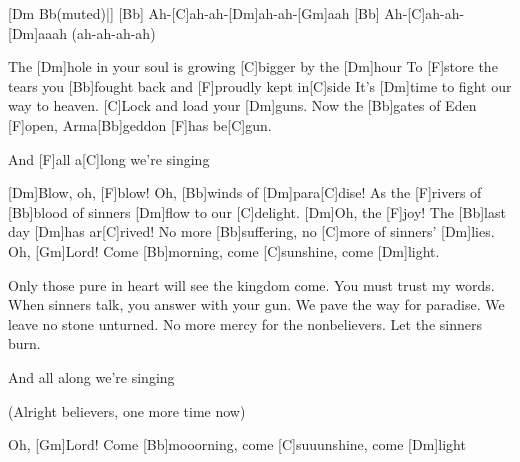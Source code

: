 

\begin{guitar}
	[Dm Bb(muted)|]{} [Bb] Ah-[C]ah-ah-[Dm]ah-ah-[Gm]aah
	[Bb] Ah-[C]ah-ah-[Dm]aaah (ah-ah-ah-ah)
	
	The [Dm]hole in your soul is growing [C]bigger by the [Dm]hour
	To [F]store the tears you [Bb]fought back and [F]proudly kept in[C]side
	It's [Dm]time to fight our way to heaven. [C]Lock and load your [Dm]guns.
	Now the [Bb]gates of Eden [F]open, Arma[Bb]geddon [F]has be[C]gun.
	
	And [F]all a[C]long we're singing
	
	[Dm]Blow, oh, [F]blow! Oh, [Bb]winds of [Dm]para[C]dise!
	As the [F]rivers of [Bb]blood of sinners [Dm]flow to our [C]delight.
	[Dm]Oh, the [F]joy! The [Bb]last day [Dm]has ar[C]rived!
	No more [Bb]suffering, no [C]more of sinners' [Dm]lies. Oh, [Gm]Lord!
	Come [Bb]morning, come [C]sunshine, come [Dm]light.
	
	Only those pure in heart will see the kingdom come.
	You must trust my words. When sinners talk, you answer with your gun.
	We pave the way for paradise. We leave no stone unturned.
	No more mercy for the nonbelievers. Let the sinners burn.
	
	And all along we're singing
	
	 
	
	(Alright believers, one more time now)
	
	 
	
	Oh, [Gm]Lord!
	Come [Bb]mooorning, come [C]suuunshine, come [Dm]light
\end{guitar}